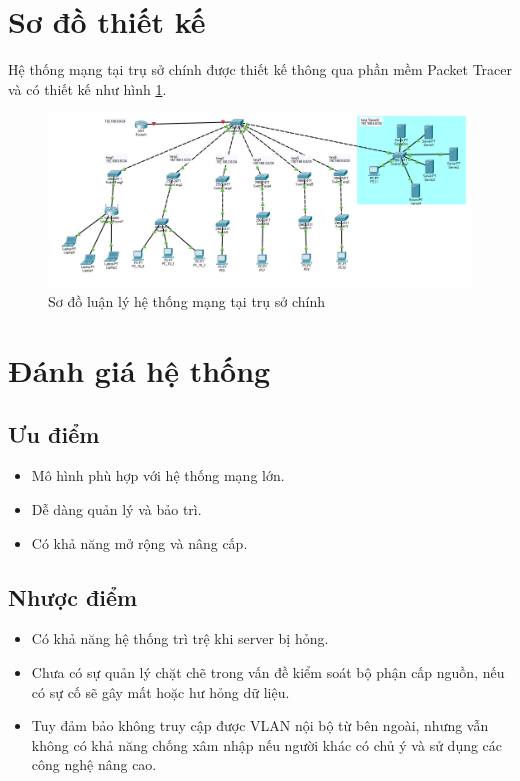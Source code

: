 \documentclass[a4paper]{article}
\begin{document}
\section{Sơ đồ thiết kế}
Hệ thống mạng tại trụ sở chính được thiết kế thông qua phần mềm Packet Tracer và có thiết kế như hình \ref{fig:So_do_logical}.

\begin{figure}[H]
    \centering
    \includegraphics[width=\textwidth]{Images/So_do_logical.png}
    \caption{Sơ đồ luận lý hệ thống mạng tại trụ sở chính}
    \label{fig:So_do_logical}
\end{figure}

\section{Đánh giá hệ thống}
\subsection{Ưu điểm}
\begin{itemize}
    \item Mô hình phù hợp với hệ thống mạng lớn.
    \item Dễ dàng quản lý và bảo trì.
    \item Có khả năng mở rộng và nâng cấp.
\end{itemize}
\subsection{Nhược điểm}
\begin{itemize}
    \item Có khả năng hệ thống trì trệ khi server bị hỏng.
    \item Chưa có sự quản lý chặt chẽ trong vấn đề kiểm soát bộ phận cấp nguồn, nếu có sự cố sẽ gây mất hoặc hư hỏng dữ liệu.
    \item Tuy đảm bảo không truy cập được VLAN nội bộ từ bên ngoài, nhưng vẫn không có khả năng chống xâm nhập nếu người khác có chủ ý và sử dụng các công nghệ nâng cao. 
\end{itemize}

\newpage
% 
% 
\end{document}
